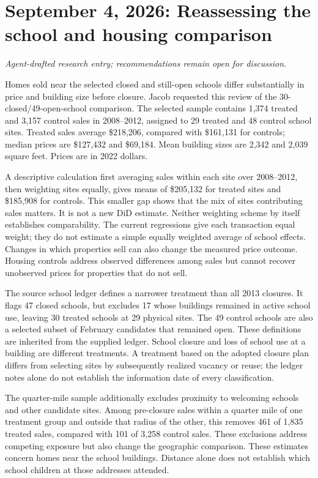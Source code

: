 \section*{September 4, 2026: Reassessing the school and housing comparison}
\textit{Agent-drafted research entry; recommendations remain open for discussion.}

Homes sold near the selected closed and still-open schools differ
substantially in price and building size before closure. Jacob requested
this review of the 30-closed/49-open-school comparison. The selected sample
contains 1,374 treated and 3,157 control
sales in 2008--2012, assigned to 29 treated and 48 control school sites.
Treated sales average \$218,206, compared with \$161,131 for controls; median
prices are \$127,432 and \$69,184. Mean building sizes are 2,342 and 2,039
square feet. Prices are in 2022 dollars.

A descriptive calculation first averaging sales within each site over
2008--2012, then weighting sites equally, gives means of \$205,132 for treated
sites and \$185,908 for controls. This smaller gap shows that the mix of sites
contributing sales matters. It is not a new DiD estimate. Neither weighting
scheme by itself establishes comparability. The current regressions give
each transaction equal weight; they do not estimate a simple equally weighted
average of school effects. Changes in which properties sell can also change
the measured price outcome. Housing controls address observed differences
among sales but cannot recover unobserved prices for properties that do not sell.

The source school ledger defines a narrower treatment than all 2013 closures.
It flags 47 closed schools, but excludes 17 whose buildings remained in active
school use, leaving 30 treated schools at 29 physical sites. The 49 control
schools are also a selected subset of February candidates that remained open.
These definitions are inherited from the supplied ledger. School closure and
loss of school use at a building are different treatments. A treatment based
on the adopted closure plan differs from selecting sites by subsequently
realized vacancy or reuse; the ledger notes alone do not establish the
information date of every classification.

The quarter-mile sample additionally excludes proximity to welcoming schools
and other candidate sites. Among pre-closure sales within a quarter mile of one treatment group
and outside that radius of the other, this removes 461 of 1,835 treated sales,
compared with 101 of 3,258
control sales. These exclusions address competing exposure but also change
the geographic comparison. These estimates concern homes near the school buildings. Distance alone
does not establish which school children at those addresses attended.

